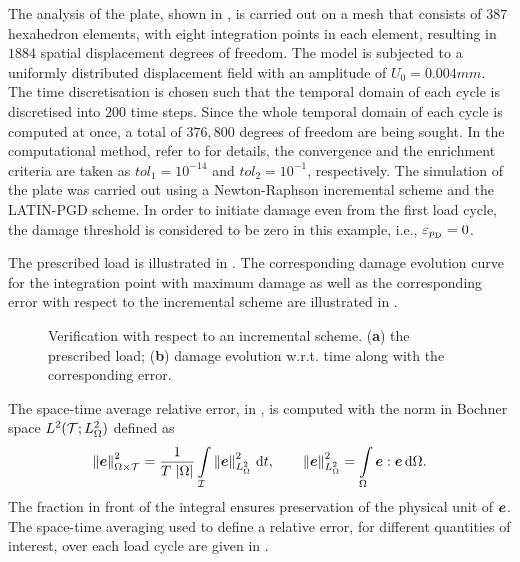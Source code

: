 The analysis of the plate, shown in , is carried out on a mesh that consists of $387$ hexahedron elements, with eight integration points in each element, resulting in $1884$ spatial displacement degrees of freedom. The model is subjected to a uniformly distributed displacement field with an amplitude of $U_0= 0.004\unit{mm}$. The time discretisation is chosen such that the temporal domain of each cycle is discretised into $200$ time steps. Since the whole temporal domain of each cycle is computed at once, a total of $376,800$ degrees of freedom are being sought. In the computational method, refer to  for details, the convergence and the enrichment criteria are taken as $tol_1=10^{-14}$ and $tol_2=10^{-1}$, respectively. The simulation of the plate was carried out using a Newton-Raphson incremental scheme and the LATIN-PGD scheme. In order to initiate damage even from the first load cycle, the damage threshold is considered to be zero in this example, i.e., $\varepsilon_{p_{\rm D}} = 0$.

The prescribed load is illustrated in . The corresponding damage evolution curve for the integration point with maximum damage as well as the corresponding error with respect to the incremental scheme are illustrated in .
\begin{figure}[hbt!]
	\centering
	\begin{subfigure}[]{0.49\linewidth}
		
		\caption{}
		\label{fig_verification_load}
	\end{subfigure}
	\hfil
	\begin{subfigure}[]{0.49\linewidth}
		
		\caption{}
		\label{fig_verification_error}
	\end{subfigure}
	\caption{Verification with respect to an incremental scheme.  (\textbf{a}) the prescribed load; (\textbf{b}) damage evolution w.r.t. time along with the corresponding error.}
\end{figure}

The space-time average relative error, in , is computed with the norm in Bochner space $L^2({\cal T};L^2_\Omega)$ defined as
\begin{equation}
	\left\lVert {\mbox{$\bm  e$}} \right\rVert_{\Omega\times{\cal T}}^2 = \frac{1}{T \ |\Omega|} \int \displaylimits_{{\cal I}} \left\lVert \mbox{$\bm  e$} \right\rVert^2_{L^2_\Omega} {\,\rm d} t, \qquad \left\lVert \mbox{$\bm  e$} \right\rVert^2_{L^2_\Omega} = \int \displaylimits_\Omega \mbox{$\bm  e$} : \mbox{$\bm  e$} {\,\rm d} \Omega.
\end{equation}
The fraction in front of the integral ensures preservation of the physical unit of $\mbox{$\bm  e$}$. The space-time averaging used to define a relative error, for different quantities of interest, over each load cycle are given in .

